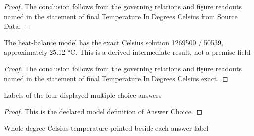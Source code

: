 \begin{proof}
  The conclusion follows from the governing relations and figure readouts named in the statement of final Temperature In Degrees Celsius from Source Data.
\end{proof}
\begin{lemma}
  \label{lem:physics:phyx-mini-0455:phyxminiproblems-problemphyxmini0455-finaltemperatureindegreescelsius-exact}
  The heat-balance model has the exact Celsius solution 1269500 / 50539, approximately 25.12 °C. This is a derived intermediate result, not a premise field
\end{lemma}
\begin{proof}
  The conclusion follows from the governing relations and figure readouts named in the statement of final Temperature In Degrees Celsius exact.
\end{proof}
\begin{definition}
  \label{def:physics:phyx-mini-0455:phyxminiproblems-problemphyxmini0455-answerchoice}
  Labels of the four displayed multiple-choice answers
\end{definition}
\begin{proof}
  This is the declared model definition of Answer Choice.
\end{proof}
\begin{definition}
  \label{def:physics:phyx-mini-0455:phyxminiproblems-problemphyxmini0455-displayedtemperaturedegreescelsius}
  Whole-degree Celsius temperature printed beside each answer label
\end{definition}
